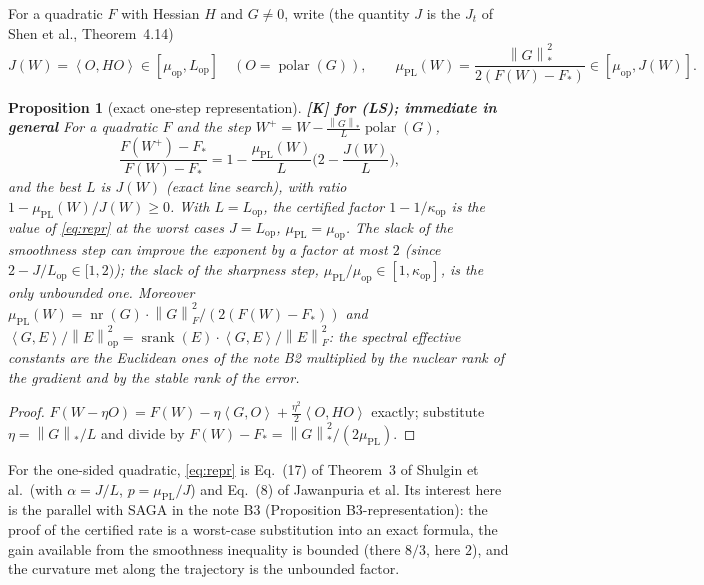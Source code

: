 \documentclass[11pt]{article}
\newtheorem{proposition}[theorem]{Proposition}
\theoremstyle{definition}
\theoremstyle{remark}
\newcommand{\nop}[1]{\left\|#1\right\|_{\mathrm{op}}}
\newcommand{\nnuc}[1]{\left\|#1\right\|_{*}}
\newcommand{\nF}[1]{\left\|#1\right\|_{F}}
\newcommand{\inner}[2]{\left\langle #1, #2 \right\rangle}
\newcommand{\polar}{\operatorname{polar}}
\newcommand{\srank}{\operatorname{srank}}
\newcommand{\nr}{\operatorname{nr}}
\newcommand{\Lop}{L_{\mathrm{op}}}
\newcommand{\muop}{\mu_{\mathrm{op}}}
\newcommand{\kop}{\kappa_{\mathrm{op}}}
\begin{document}
For a quadratic $F$ with Hessian $H$ and $G\ne0$, write (the quantity $J$ is the $J_t$ of Shen et al., Theorem~4.14)
\[
J(W)=\inner{O}{HO}\in[\muop,\Lop]\quad(O=\polar(G)),\qquad
\mu_{\mathrm{PL}}(W)=\frac{\nnuc G^2}{2(F(W)-F_\ast)}\in[\muop,J(W)].
\]

\begin{proposition}[exact one-step representation]\label{prop:repr} \textbf{[K] for (LS); immediate in general}
For a quadratic $F$ and the step $W^+=W-\frac{\nnuc G}{L}\polar(G)$,
\begin{equation}\label{eq:repr}
\frac{F(W^+)-F_\ast}{F(W)-F_\ast}=1-\frac{\mu_{\mathrm{PL}}(W)}{L}\Big(2-\frac{J(W)}{L}\Big),
\end{equation}
and the best $L$ is $J(W)$ (exact line search), with ratio $1-\mu_{\mathrm{PL}}(W)/J(W)\ge0$. With $L=\Lop$, the
certified factor $1-1/\kop$ is the value of \eqref{eq:repr} at the worst cases $J=\Lop$, $\mu_{\mathrm{PL}}=\muop$. The
slack of the smoothness step can improve the exponent by a factor at most $2$ (since $2-J/\Lop\in[1,2)$); the slack of
the sharpness step, $\mu_{\mathrm{PL}}/\muop\in[1,\kop]$, is the only unbounded one. Moreover
$\mu_{\mathrm{PL}}(W)=\nr(G)\cdot\nF G^2/(2(F(W)-F_\ast))$ and
$\inner GE/\nop E^2=\srank(E)\cdot\inner GE/\nF E^2$: the spectral effective constants are the Euclidean ones of the
note B2 multiplied by the nuclear rank of the gradient and by the stable rank of the error.
\end{proposition}
\begin{proof}
$F(W-\eta O)=F(W)-\eta\inner GO+\frac{\eta^2}2\inner O{HO}$ exactly; substitute $\eta=\nnuc G/L$ and divide by
$F(W)-F_\ast=\nnuc G^2/(2\mu_{\mathrm{PL}})$.
\end{proof}

For the one-sided quadratic, \eqref{eq:repr} is Eq.~(17) of Theorem~3 of Shulgin et al.\ (with $\alpha=J/L$,
$p=\mu_{\mathrm{PL}}/J$) and Eq.~(8) of Jawanpuria et al. Its interest here is the parallel with SAGA in the note B3
(Proposition B3-representation): the proof of the certified rate is a worst-case substitution into an exact formula,
the gain available from the smoothness inequality is bounded (there $8/3$, here $2$), and the curvature met along the
trajectory is the unbounded factor.
\end{document}
